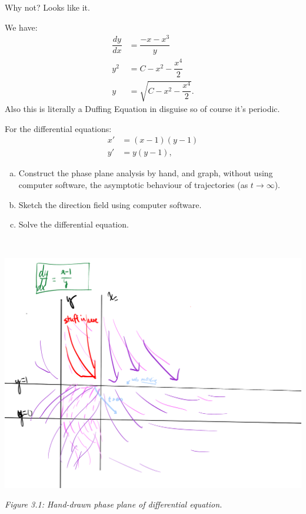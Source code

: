 \documentclass[11pt]{article}
\begin{document}
    \begin{solution}[Answer 2b]
        Why not? Looks like it.
    \end{solution}
    \begin{solution}[Solution 2c]
        We have:
        \begin{align}
            \dfrac{dy}{dx} &= \dfrac{-x-x^3}{y} \\
            y^2 &= C-x^2- \dfrac{x^4}{2} \\
            y &= \sqrt{ C-x^2- \dfrac{x^4}{2}}.
        \end{align} 
        Also this is literally a Duffing Equation in disguise so of course it's periodic.
    \end{solution}
    \newpage
    \begin{problem}
        \setcounter{equation}{-1} \break
        For the differential equations:
        \begin{align}
            x' &= (x-1)(y-1) \\
            y' &= y(y-1),
        \end{align}
        \begin{enumerate}[(a)]
            \item Construct the phase plane analysis by hand, and graph, without using computer software, the asymptotic behaviour of trajectories (as $t \rightarrow \infty$).
            \item Sketch the direction field using computer software.
            \item Solve the differential equation.
        \end{enumerate}
    \end{problem}
    \begin{solution}
        \textit{$\text{ }$ \newline}
        \begin{center}
            \includegraphics[scale=0.3]{3.pdf}
        \end{center}
        \begin{center}
            \textit{Figure 3.1: Hand-drawn phase plane of differential equation.}
        \end{center}
    \end{solution}
\end{document}
